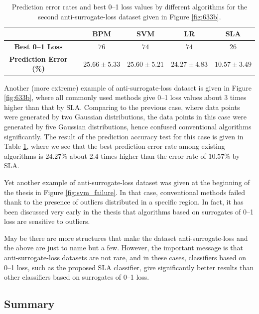 \begin{table}[htbp!]
\centering
\begin{tabular}{|cc|  ccc|c|}
\hline\hline
 && {\bf BPM} & {\bf SVM} & {\bf LR} & {\bf SLA}\\  
\hline
{\bf Best 0--1 Loss} && 
$76$ & $74$ & $74$ & $26$ \\  
{\bf Prediction Error (\%)} && 
$25.66 \pm 5.33$ & $25.60 \pm 5.21$ & $24.27 \pm 4.83$ & $10.57 \pm 3.49$ \\  
\hline\hline
\end{tabular}
\caption{Prediction error rates and best 0--1 loss values by different
  algorithms for the second anti-surrogate-loss dataset given in
  Figure \ref{fig:633b}.}
\label{tab:antirates2}
\end{table}

Another (more extreme) example of anti-surrogate-loss dataset is given
in Figure \ref{fig:633b}, where all commonly used methods give 0--1
loss values about 3 times higher than that by SLA. Comparing to the
previous case, where data points were generated by two Gaussian
distributions, the data points in this case were generated by five
Gaussian distributions, hence confused conventional algorithms
significantly. The result of the prediction accuracy test for this
case is given in Table \ref{tab:antirates2}, where we see that the
best prediction error rate among existing algorithms is $24.27\%$
about 2.4 times higher than the error rate of $10.57\%$ by SLA.

Yet another example of anti-surrogate-loss dataset was given at the
beginning of the thesis in Figure \ref{fig:svm_failure}. In that case,
conventional methods failed thank to the presence of outliers
distributed in a specific region. In fact, it has been discussed very
early in the thesis that algorithms based on surrogates of 0--1 loss
are sensitive to outliers.

May be there are more structures that make the dataset
anti-surrogate-loss and the above are just to name but a few. However,
the important message is that anti-surrogate-loss datasets are not
rare, and in these cases, classifiers based on 0--1 loss, such as the
proposed SLA classifier, give significantly better results than other
classifiers based on surrogates of 0--1 loss.


\subsection{Summary}
\label{sec:rc.summary}

